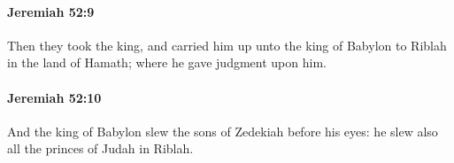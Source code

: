 		\paragraph{Jeremiah 52:9} %
			\label{JEREMIAH-52-9}

			Then they took the king, and carried him up unto the king of Babylon to Riblah in the land of Hamath; where he gave judgment upon him.


		\paragraph{Jeremiah 52:10} %
			\label{JEREMIAH-52-10}

			And the king of Babylon slew the sons of Zedekiah before his eyes: he slew also all the princes of Judah in Riblah.


